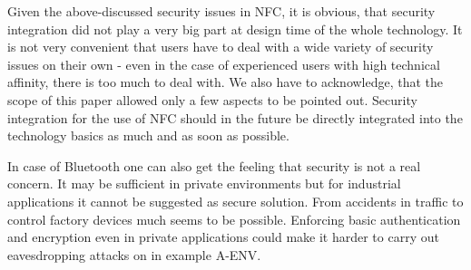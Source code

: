 \documentclass[12pt,a4paper]{article}
\begin{document}
Given the above-discussed security issues in NFC, it is obvious, that security integration did not play a very big part at design time of the whole technology. It is not very convenient that users have to deal with a wide variety of security issues on their own - even in the case of experienced users with high technical affinity, there is too much to deal with. We also have to acknowledge, that the scope of this paper allowed only a few aspects to be pointed out. Security integration for the use of NFC should in the future be directly integrated into the technology basics as much and as soon as possible.

In case of Bluetooth one can also get the feeling that security is not a real concern. It may be sufficient in private environments but for industrial applications it cannot be suggested as secure solution. From accidents in traffic to control factory devices much seems to be possible. Enforcing basic authentication and encryption even in private applications could make it harder to carry out eavesdropping attacks on in example A-ENV.

{}

\end{document}
